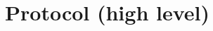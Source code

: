 \documentclass{article}
\newcommand{\squadt}{SQuADT\xspace}
\begin{document}


%
%   
%

 \section{Protocol (high level)} \label{s:message_definitions}
\end{document}
